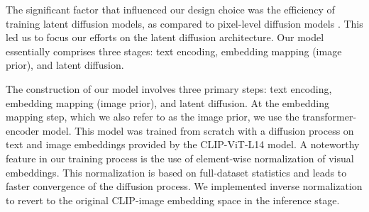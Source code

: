 \documentclass[11pt]{article}
\begin{document}
The significant factor that influenced our design choice was the efficiency of training latent diffusion models, as compared to pixel-level diffusion models \cite{rombach2022highresolution}. This led us to focus our efforts on the latent diffusion architecture. Our model essentially comprises three stages: text encoding, embedding mapping (image prior), and latent diffusion.

The construction of our model involves three primary steps: text encoding, embedding mapping (image prior), and latent diffusion.
At the embedding mapping step, which we also refer to as the image prior, we use the transformer-encoder model. This model was trained from scratch with a diffusion process on text and image embeddings provided by the CLIP-ViT-L14 model. A noteworthy feature in our training process is the use of element-wise normalization of visual embeddings. This normalization is based on full-dataset statistics and leads to faster convergence of the diffusion process. We implemented inverse normalization to revert to the original CLIP-image embedding space in the inference stage.
\end{document}
